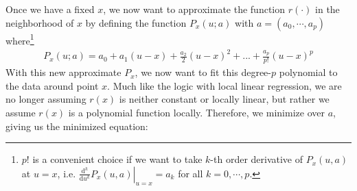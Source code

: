 Once we have a fixed $x$, we now want to approximate the function $r(\cdot)$ in the neighborhood of $x$ by defining the function $P_x(u;a)$ with $a = (a_0, \cdots, a_p)$ where\footnote{$p!$ is a convenient choice if we want to take $k$-th order derivative of $P_x(u,a)$ at $u=x$, i.e. $\left.\frac{\mathrm d^k}{\mathrm d u^k}P_x(u,a)\right|_{u=x} = a_k$ for all $k=0,\cdots, p$.} 
\begin{align}
P_x(u;a) = a_0 + a_1(u - x) + \frac{a_2}{2}(u - x)^2 + ... + \frac{a_p}{p!}(u - x)^p  
\end{align}
 With this new approximate $P_x$, we now want to fit this degree-$p$ polynomial to the data around point $x$. Much like the logic with local linear regression, we are no longer assuming $r(x)$ is neither constant or locally linear, but rather we assume $r(x)$ is a polynomial function locally. Therefore, we minimize over $a$, giving us the minimized equation: 

